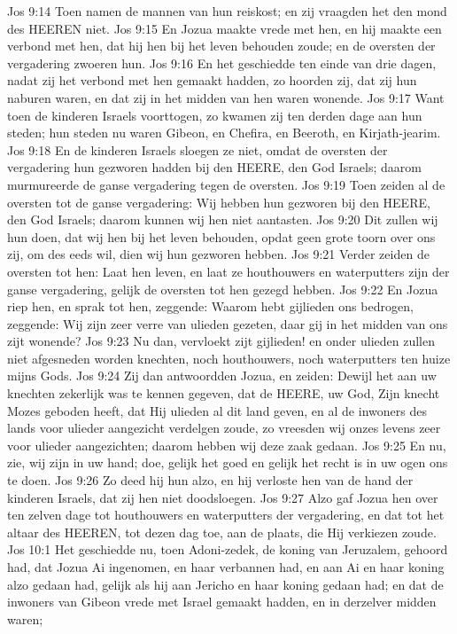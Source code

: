 Jos 9:14  Toen namen de mannen van hun reiskost; en zij vraagden het den mond des HEEREN niet.
Jos 9:15  En Jozua maakte vrede met hen, en hij maakte een verbond met hen, dat hij hen bij het leven behouden zoude; en de oversten der vergadering zwoeren hun.
Jos 9:16  En het geschiedde ten einde van drie dagen, nadat zij het verbond met hen gemaakt hadden, zo hoorden zij, dat zij hun naburen waren, en dat zij in het midden van hen waren wonende.
Jos 9:17  Want toen de kinderen Israels voorttogen, zo kwamen zij ten derden dage aan hun steden; hun steden nu waren Gibeon, en Chefira, en Beeroth, en Kirjath-jearim.
Jos 9:18  En de kinderen Israels sloegen ze niet, omdat de oversten der vergadering hun gezworen hadden bij den HEERE, den God Israels; daarom murmureerde de ganse vergadering tegen de oversten.
Jos 9:19  Toen zeiden al de oversten tot de ganse vergadering: Wij hebben hun gezworen bij den HEERE, den God Israels; daarom kunnen wij hen niet aantasten.
Jos 9:20  Dit zullen wij hun doen, dat wij hen bij het leven behouden, opdat geen grote toorn over ons zij, om des eeds wil, dien wij hun gezworen hebben.
Jos 9:21  Verder zeiden de oversten tot hen: Laat hen leven, en laat ze houthouwers en waterputters zijn der ganse vergadering, gelijk de oversten tot hen gezegd hebben.
Jos 9:22  En Jozua riep hen, en sprak tot hen, zeggende: Waarom hebt gijlieden ons bedrogen, zeggende: Wij zijn zeer verre van ulieden gezeten, daar gij in het midden van ons zijt wonende?
Jos 9:23  Nu dan, vervloekt zijt gijlieden! en onder ulieden zullen niet afgesneden worden knechten, noch houthouwers, noch waterputters ten huize mijns Gods.
Jos 9:24  Zij dan antwoordden Jozua, en zeiden: Dewijl het aan uw knechten zekerlijk was te kennen gegeven, dat de HEERE, uw God, Zijn knecht Mozes geboden heeft, dat Hij ulieden al dit land geven, en al de inwoners des lands voor ulieder aangezicht verdelgen zoude, zo vreesden wij onzes levens zeer voor ulieder aangezichten; daarom hebben wij deze zaak gedaan.
Jos 9:25  En nu, zie, wij zijn in uw hand; doe, gelijk het goed en gelijk het recht is in uw ogen ons te doen.
Jos 9:26  Zo deed hij hun alzo, en hij verloste hen van de hand der kinderen Israels, dat zij hen niet doodsloegen.
Jos 9:27  Alzo gaf Jozua hen over ten zelven dage tot houthouwers en waterputters der vergadering, en dat tot het altaar des HEEREN, tot dezen dag toe, aan de plaats, die Hij verkiezen zoude.
Jos 10:1  Het geschiedde nu, toen Adoni-zedek, de koning van Jeruzalem, gehoord had, dat Jozua Ai ingenomen, en haar verbannen had, en aan Ai en haar koning alzo gedaan had, gelijk als hij aan Jericho en haar koning gedaan had; en dat de inwoners van Gibeon vrede met Israel gemaakt hadden, en in derzelver midden waren;
